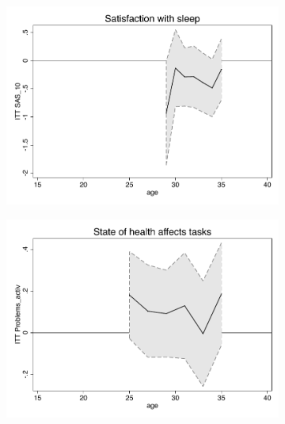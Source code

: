 \documentclass[a4paper ]{article}
\begin{document}
\begin{figure}[p]
\begin{subfigure}[h]{0.48\textwidth}\centering
	\includegraphics[width=\textwidth]{../../analysis/graphs/SOEP/SAS_10_LC.pdf}
\end{subfigure}
\quad
\begin{subfigure}[h]{0.48\textwidth}\centering
	\includegraphics[width=\textwidth]{../../analysis/graphs/SOEP/Problems_activ_LC.pdf}
\end{subfigure}




\end{figure}
\end{document}
